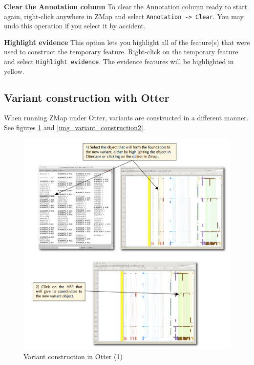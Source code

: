 \documentclass[letterpaper]{article}
\begin{document}
\textbf{Clear the Annotation column}
To clear the Annotation column ready to start again, right-click anywhere in ZMap and select \lstinline{Annotation -> Clear}. You may undo this operation if you select it by accident.

\textbf{Highlight evidence}
This option lets you highlight all of the feature(s) that were used to construct the temporary feature. Right-click on the temporary feature and select \lstinline{Highlight evidence}. The evidence features will be highlighted in yellow.


\subsection{Variant construction with Otter}
When running ZMap under Otter, variants are constructed in a different manner. See figures \ref{img_variant_construction} and \ref{img_variant_construction2}.

\begin{figure}
\centering
\color[rgb]{0.30980393,0.5058824,0.7411765}
\includegraphics[width=15.231cm]{images/variant_construction.png}
\caption{Variant construction in Otter (1)}
\label{img_variant_construction}
\end{figure}
\end{document}
